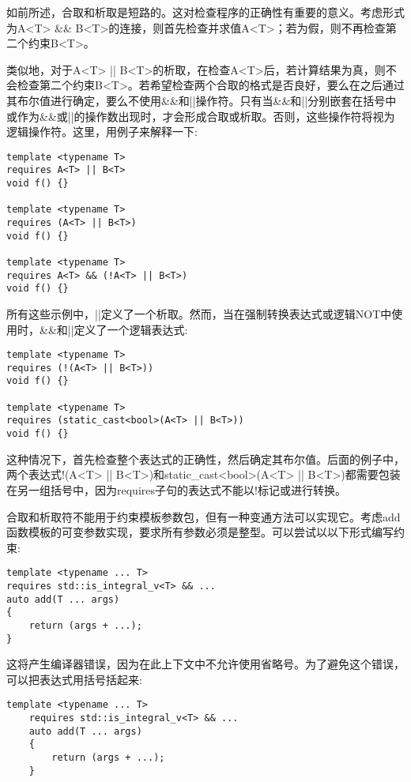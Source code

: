 如前所述，合取和析取是短路的。这对检查程序的正确性有重要的意义。考虑形式为A<T> \&\& B<T>的连接，则首先检查并求值A<T>；若为假，则不再检查第二个约束B<T>。

类似地，对于A<T> || B<T>的析取，在检查A<T>后，若计算结果为真，则不会检查第二个约束B<T>。若希望检查两个合取的格式是否良好，要么在之后通过其布尔值进行确定，要么不使用\&\&和||操作符。只有当\&\&和||分别嵌套在括号中或作为\&\&或||的操作数出现时，才会形成合取或析取。否则，这些操作符将视为逻辑操作符。这里，用例子来解释一下:

\begin{lstlisting}[style=styleCXX]
template <typename T>
requires A<T> || B<T>
void f() {}

template <typename T>
requires (A<T> || B<T>)
void f() {}

template <typename T>
requires A<T> && (!A<T> || B<T>)
void f() {}
\end{lstlisting}

所有这些示例中，||定义了一个析取。然而，当在强制转换表达式或逻辑NOT中使用时，\&\&和||定义了一个逻辑表达式:

\begin{lstlisting}[style=styleCXX]
template <typename T>
requires (!(A<T> || B<T>))
void f() {}

template <typename T>
requires (static_cast<bool>(A<T> || B<T>))
void f() {}
\end{lstlisting}

这种情况下，首先检查整个表达式的正确性，然后确定其布尔值。后面的例子中，两个表达式!(A<T> || B<T>)和static\_cast<bool>(A<T> || B<T>)都需要包装在另一组括号中，因为requires子句的表达式不能以!标记或进行转换。

合取和析取符不能用于约束模板参数包，但有一种变通方法可以实现它。考虑add函数模板的可变参数实现，要求所有参数必须是整型。可以尝试以以下形式编写约束:

\begin{lstlisting}[style=styleCXX]
template <typename ... T>
requires std::is_integral_v<T> && ...
auto add(T ... args)
{
	return (args + ...);
}
\end{lstlisting}

这将产生编译器错误，因为在此上下文中不允许使用省略号。为了避免这个错误，可以把表达式用括号括起来:

\begin{lstlisting}[style=styleCXX]
	template <typename ... T>
	requires std::is_integral_v<T> && ...
	auto add(T ... args)
	{
		return (args + ...);
	}
\end{lstlisting}

